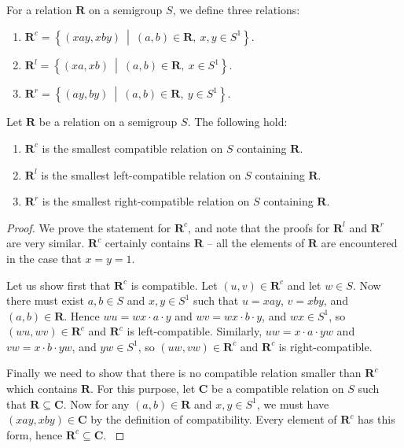 \begin{definition}
  \label{def:rc}
  For a relation $\mathbf{R}$ on a semigroup $S$, we define three relations:
  \begin{enumerate}[\rm(i)]
  \item
    $\mathbf{R}^c = \left\{(xay, xby) ~\middle|~ (a,b) \in \mathbf{R},~x,y \in
      S^1\right\}$.
  \item
    $\mathbf{R}^l = \left\{(xa, xb) ~\middle|~ (a,b) \in \mathbf{R},~x \in
      S^1\right\}$.
  \item
    $\mathbf{R}^r = \left\{(ay, by) ~\middle|~ (a,b) \in \mathbf{R},~y \in
      S^1\right\}$.
  \end{enumerate}
\end{definition}

\begin{lemma}
  \label{lem:rc}
  Let $\mathbf{R}$ be a relation on a semigroup $S$.
  The following hold:
  \begin{enumerate}[\rm(i)]
  \item $\mathbf{R}^c$ is the smallest compatible relation on $S$ containing
    $\mathbf{R}$.
  \item $\mathbf{R}^l$ is the smallest left-compatible relation on $S$
    containing $\mathbf{R}$.
  \item $\mathbf{R}^r$ is the smallest right-compatible relation on $S$
    containing $\mathbf{R}$.
  \end{enumerate}
  \begin{proof}
    We prove the statement for $\mathbf{R}^c$, and note that the proofs for
    $\mathbf{R}^l$ and $\mathbf{R}^r$ are very similar.
    $\mathbf{R}^c$ certainly contains $\mathbf{R}$ -- all the elements of
    $\mathbf{R}$ are encountered in the case that $x=y=1$.

    Let us show first that $\mathbf{R}^c$ is compatible.
    Let $(u,v) \in \mathbf{R}^c$ and let $w \in S$.  Now there must exist $a,b
    \in S$ and $x,y \in S^1$ such that $u=xay$, $v=xby$, and $(a,b) \in
    \mathbf{R}$.  Hence
    $wu = wx \cdot a \cdot y$ and
    $wv = wx \cdot b \cdot y$, and $wx \in S^1$,
    so $(wu,wv) \in \mathbf{R}^c$ and $\mathbf{R}^c$ is left-compatible.
    Similarly,
    $uw = x \cdot a \cdot yw$ and
    $vw = x \cdot b \cdot yw$, and $yw \in S^1$,
    so $(uw,vw) \in \mathbf{R}^c$ and $\mathbf{R}^c$ is right-compatible.

    Finally we need to show that there is no compatible relation smaller than
    $\mathbf{R}^c$ which contains $\mathbf{R}$.  For this purpose, let
    $\mathbf{C}$ be a compatible relation on $S$ such that $\mathbf{R} \subseteq
    \mathbf{C}$.  Now for any $(a,b) \in \mathbf{R}$ and $x,y \in S^1$, we must
    have $(xay,xby) \in \mathbf{C}$ by the definition of compatibility.  Every
    element of $\mathbf{R}^c$ has this form, hence $\mathbf{R}^c \subseteq
    \mathbf{C}$. \cite[\S1.5]{howie}
  \end{proof}
\end{lemma}

